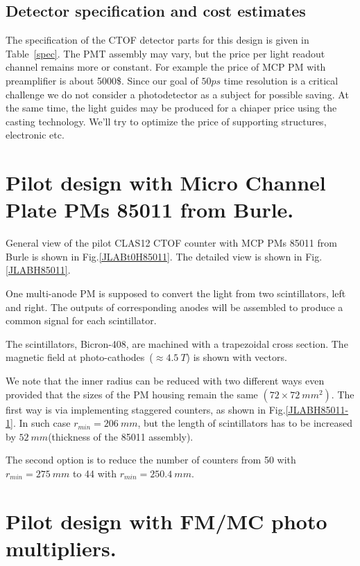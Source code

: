 \subsection{Detector specification and cost estimates}

The specification of the CTOF detector parts  for this  design  is given in Table~\ref{spec}.
The PMT assembly  may vary, but the price per  light readout channel 
remains more or constant.
For example the price of MCP PM with preamplifier is about 5000\$. 
Since our goal of $50ps$ time resolution  is  a critical challenge  
we do not consider a photodetector
 as a  subject  for possible saving. 
At the same time, the light guides may be produced for a chiaper
price using the casting technology. We'll try to optimize the price of supporting 
structures, electronic etc. 

\section{Pilot design with Micro Channel Plate PMs 85011 from Burle.}
\label{des85011}
General view of the pilot  CLAS12 CTOF  counter with MCP PMs 85011 from Burle is
shown in Fig.\ref{JLABt0H85011}.
 The detailed view is shown in  Fig.\ref{JLABH85011}.

One multi-anode PM is supposed to convert  the light from two scintillators, left and right. 
The outputs of corresponding anodes will be
assembled to produce a common  signal for each scintillator. 

The scintillators,  Bicron-408,  are machined with a trapezoidal cross section. 
The magnetic field  at photo-cathodes~($\approx 4.5~T$) is shown with vectors. 

We note that the inner radius  can  be  reduced with two different ways even  provided that
the sizes of the PM  housing remain  the same $(72\times72~mm^2)$. 
The first way is via implementing  staggered counters, 
as shown in Fig.\ref{JLABH85011-1}. 
In such case $r_{min}=206~mm$, but the length of scintillators has to be increased by $52~mm$(thickness of 
the 85011 assembly).

The second option is to  reduce the number of counters from 50 with $r_{min}=275~mm$ to 44  with $r_{min}=250.4~mm$.






\section{Pilot design with FM/MC photo multipliers.}

